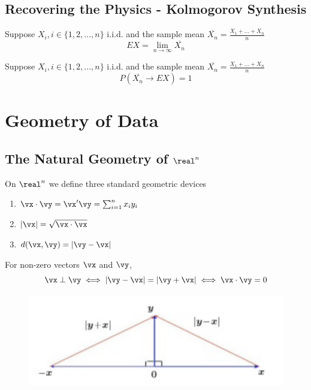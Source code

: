 \documentclass[11pt]{article}
\numberwithin{equation}{section}
\begin{document}
\subsection{Recovering the Physics - Kolmogorov Synthesis}
Suppose $X_i, i \in \{1, 2, ..., n\}$ i.i.d. and the sample mean $\overline{X_n} = \frac{X_1 + \hdots + X_n}{n}$
\begin{equation}
	EX = \lim_{n\rightarrow\infty} \overline{X_n}
\end{equation}

Suppose $X_i, i \in \{1, 2, ..., n\}$ i.i.d. and the sample mean $\overline{X_n} = \frac{X_1 + \hdots + X_n}{n}$
\begin{equation}
	P \left( \overline{X_n} \rightarrow EX\right) = 1
\end{equation}

\section{Geometry of Data}
\subsection{The Natural Geometry of $\real^n$}
On $\real^n$ we define three standard geometric devices
\begin{enumerate}
	\item {} $\vx \cdot \vy = \vx'\vy = \sum_{i=1}^nx_iy_i$
	\item {} $|\vx| = \sqrt{\vx \cdot \vx}$
	\item {} $d(\vx, \vy) = |\vy - \vx|$
\end{enumerate}

For non-zero vectors $\vx$ and $\vy$,
\begin{equation}
	\vx \perp \vy \iff |\vy - \vx| = |\vy + \vx| \iff \vx \cdot \vy = 0
\end{equation}

\begin{figure}[H]
	\centering
	\includegraphics[scale=0.5]{p1}
\end{figure}
\end{document}
